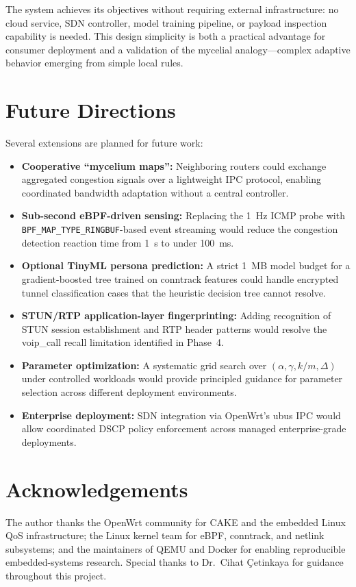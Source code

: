 The system achieves its objectives without requiring external infrastructure: no cloud service, SDN controller, model training pipeline, or payload inspection capability is needed. This design simplicity is both a practical advantage for consumer deployment and a validation of the mycelial analogy---complex adaptive behavior emerging from simple local rules.

\section{Future Directions}

Several extensions are planned for future work:

\begin{itemize}
  \item \textbf{Cooperative ``mycelium maps'':} Neighboring routers could exchange aggregated congestion signals over a lightweight IPC protocol, enabling coordinated bandwidth adaptation without a central controller.

  \item \textbf{Sub-second eBPF-driven sensing:} Replacing the 1~Hz ICMP probe with \texttt{BPF\_MAP\_TYPE\_RINGBUF}-based event streaming would reduce the congestion detection reaction time from 1~s to under 100~ms.

  \item \textbf{Optional TinyML persona prediction:} A strict 1~MB model budget for a gradient-boosted tree trained on conntrack features could handle encrypted tunnel classification cases that the heuristic decision tree cannot resolve.

  \item \textbf{STUN/RTP application-layer fingerprinting:} Adding recognition of STUN session establishment and RTP header patterns would resolve the voip\_call recall limitation identified in Phase~4.

  \item \textbf{Parameter optimization:} A systematic grid search over $(\alpha, \gamma, k/m, \Delta)$ under controlled workloads would provide principled guidance for parameter selection across different deployment environments.

  \item \textbf{Enterprise deployment:} SDN integration via OpenWrt's ubus IPC would allow coordinated DSCP policy enforcement across managed enterprise-grade deployments.
\end{itemize}

\section{Acknowledgements}

The author thanks the OpenWrt community for CAKE and the embedded Linux QoS infrastructure; the Linux kernel team for eBPF, conntrack, and netlink subsystems; and the maintainers of QEMU and Docker for enabling reproducible embedded-systems research. Special thanks to Dr.\ Cihat Çetinkaya for guidance throughout this project.
